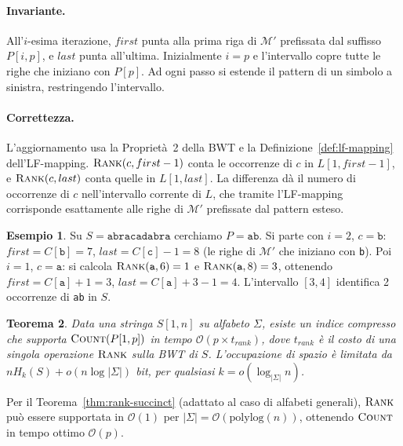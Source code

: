 \documentclass[12pt, a4paper, oneside]{book}
\theoremstyle{plain}
\newtheorem{teorema}{Teorema}[chapter]
\theoremstyle{definition}
\newtheorem{esempio}[teorema]{Esempio}
\theoremstyle{remark}
\newcommand{\OO}[1]{\mathcal{O}\!\left(#1\right)}
\newcommand{\Hk}{H_k}
\begin{document}
\paragraph{Invariante.} All'$i$-esima iterazione, $first$ punta alla prima riga di $\mathcal{M}'$ prefissata dal suffisso $P[i, p]$, e $last$ punta all'ultima. Inizialmente $i = p$ e l'intervallo copre tutte le righe che iniziano con $P[p]$. Ad ogni passo si estende il pattern di un simbolo a sinistra, restringendo l'intervallo.

\paragraph{Correttezza.} L'aggiornamento usa la Proprietà~2 della BWT e la Definizione~\ref{def:lf-mapping} dell'LF-mapping. $\textsc{Rank}(c, first - 1)$ conta le occorrenze di $c$ in $L[1, first - 1]$, e $\textsc{Rank}(c, last)$ conta quelle in $L[1, last]$. La differenza dà il numero di occorrenze di $c$ nell'intervallo corrente di $L$, che tramite l'LF-mapping corrisponde esattamente alle righe di $\mathcal{M}'$ prefissate dal pattern esteso.

\begin{esempio}
Su $S = \texttt{abracadabra}$ cerchiamo $P = \texttt{ab}$. Si parte con $i = 2$, $c = \texttt{b}$: $first = C[\texttt{b}] = 7$, $last = C[\texttt{c}] - 1 = 8$ (le righe di $\mathcal{M}'$ che iniziano con \texttt{b}). Poi $i = 1$, $c = \texttt{a}$: si calcola $\textsc{Rank}(\texttt{a}, 6) = 1$ e $\textsc{Rank}(\texttt{a}, 8) = 3$, ottenendo $first = C[\texttt{a}] + 1 = 3$, $last = C[\texttt{a}] + 3 - 1 = 4$. L'intervallo $[3, 4]$ identifica 2 occorrenze di \texttt{ab} in $S$.
\end{esempio}

\begin{teorema}
\label{thm:count-complexity}
Data una stringa $S[1,n]$ su alfabeto $\Sigma$, esiste un indice compresso che supporta $\textsc{Count}(P[1,p])$ in tempo $\OO{p \times t_{rank}}$, dove $t_{rank}$ è il costo di una singola operazione $\textsc{Rank}$ sulla BWT di $S$. L'occupazione di spazio è limitata da $n\Hk(S) + o(n \log |\Sigma|)$ bit, per qualsiasi $k = o(\log_{|\Sigma|} n)$.
\end{teorema}

Per il Teorema~\ref{thm:rank-succinct} (adattato al caso di alfabeti generali), $\textsc{Rank}$ può essere supportata in $\OO{1}$ per $|\Sigma| = \OO{\text{polylog}(n)}$, ottenendo $\textsc{Count}$ in tempo ottimo $\OO{p}$.
\end{document}
